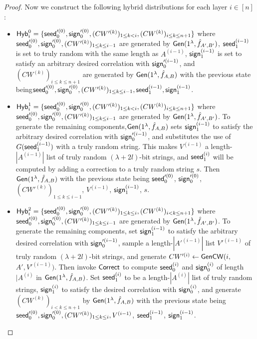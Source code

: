 \begin{proof}
    Now we construct the following hybrid distributions for each layer $i\in[n]$: 
    
    \begin{itemize}
        \item${\sf Hyb}_i^0 = \{{\sf seed}_0'^{(0)},{\sf sign}_0'^{(0)},(CW'^{(k)})_{1\le k<i},(CW^{(k)})_{i\le k\le n+1}\}$ where ${\sf seed}_0'^{(0)},{\sf sign}_0'^{(0)},(CW'^{(k)})_{1\le k\le i-1}$ are generated by ${\sf Gen}(1^\lambda, \hat{f}_{A',B'})$, ${\sf seed}_1^{(i-1)}$ is set to truly random with the same length as $A^{(i-1)}$, ${\sf sign}_1^{(i-1)}$ is set to satisfy an arbitrary desired correlation with ${\sf sign}_0'^{(i-1)}$, and $(CW^{(k)})_{i\le k\le n+1}$ are  generated by ${\sf Gen}(1^\lambda, \hat{f}_{A,B})$ with the previous state being\linebreak ${\sf seed}_0'^{(0)},{\sf sign}_0'^{(0)},(CW'^{(k)})_{1\le k\le i-1},{\sf seed}_1^{(i-1)}, {\sf sign}_1^{(i-1)}$. 
        \item ${\sf Hyb}_i^1 = \{{\sf seed}_0'^{(0)},{\sf sign}_0'^{(0)},(CW'^{(k)})_{1\le k<i},(CW^{(k)})_{i\le k\le n+1}\}$ where ${\sf seed}_0'^{(0)},{\sf sign}_0'^{(0)},(CW'^{(k)})_{1\le k\le i-1}$ are generated by ${\sf Gen}(1^\lambda, \hat{f}_{A',B'})$. To generate the remaining components,\linebreak ${\sf Gen}(1^\lambda, \hat{f}_{A,B})$ sets ${\sf sign}_1^{(i-1)}$ to satisfy the arbitrary desired correlation with ${\sf sign}_0'^{(i-1)}$, and substitutes the use of \linebreak$G({\sf seed}_1^{(i-1)})$ with a truly random string. This makes  $V^{(i-1)}$ a length-$|A^{(i-1)}|$ list of truly random $(\lambda+2l)$-bit strings, and ${\sf seed}_1^{(i)}$ will be computed by adding a correction to a truly random string $s$. Then ${\sf Gen}(1^\lambda, \hat{f}_{A,B})$ with the previous state being ${\sf seed}_0'^{(0)}$, ${\sf sign}_0'^{(0)}$, $(CW'^{(k)})_{1\le k\le i-1}$, $ V^{(i-1)}$, $ {\sf sign}_1^{(i-1)}$, $ s$. 
        \item ${\sf Hyb}_i^2 = \{{\sf seed}_0'^{(0)},{\sf sign}_0'^{(0)},(CW'^{(k)})_{1\le k\le i},(CW^{(k)})_{i< k\le n+1}\}$ where ${\sf seed}_0'^{(0)},{\sf sign}_0'^{(0)},(CW'^{(k)})_{1\le k\le i-1}$ are generated by ${\sf Gen}(1^\lambda, \hat{f}_{A',B'})$. To generate the remaining components, set ${\sf sign}_1^{(i-1)}$ to satisfy the arbitrary desired correlation with ${\sf sign}_0'^{(i-1)}$, sample a length-$|A'^{(i-1)}|$ list $V'^{(i-1)}$ of truly random $(\lambda+2l)$-bit strings, and generate $CW'^{(i)}\gets {\sf Gen}{\sf CW}(i,$\linebreak$A',V'^{(i-1)})$. Then invoke ${\sf Correct}$ to compute ${\sf seed}_0^{(i)}$ and ${\sf sign}_0^{(i)}$ of length $|A^{(i)}$ in ${\sf Gen}(1^\lambda, \hat{f}_{A,B})$. Set 
        ${\sf seed}_1^{(i)}$ to be a length-$|A^{(i)}|$ list of truly random strings, ${\sf sign}_1^{(i)}$ to satisfy the desired correlation with ${\sf sign}_0^{(i)}$, and generate \linebreak$(CW^{(k)})_{i< k\le n+1}$ by ${\sf Gen}(1^\lambda, \hat{f}_{A,B})$ with the previous state being ${\sf seed}_0'^{(0)},{\sf sign}_0'^{(0)},(CW'^{(k)})_{1\le k\le i}, V^{(i-1)}$, ${\sf seed}_1^{(i-1)}$, \linebreak$ {\sf sign}_1^{(i-1)}$. 
    \end{itemize}
    

\end{proof}
